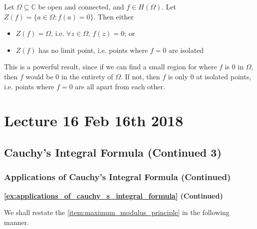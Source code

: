 \documentclass[11pt, oneside]{book}
\begin{document}
\begin{lemma}\label{lemma:principle_of_analytic_continuation}
	Let $\Omega \subseteq \mathbb{C}$ be open and connected, and $f \in H(\Omega)$. Let $Z(f) = \{a \in \Omega : f(a) = 0 \}$. Then either
	\begin{itemize}
		\item $Z(f) = \Omega$, i.e. $\forall z \in \Omega, \, f(z) = 0$; or
		\item $Z(f)$ has no limit point, i.e. points where $f = 0$ are isolated
	\end{itemize}
\end{lemma}

This is a powerful result, since if we can find a small region for where $f$ is $0$ in $\Omega$, then $f$ would be $0$ in the entirety of $\Omega$. If not, then $f$ is only $0$ at isolated points, i.e. points where $f = 0$ are all apart from each other.




\chapter{Lecture 16 Feb 16th 2018}
	\label{chapter:lecture_16_feb_16th_2018}

\section{Cauchy's Integral Formula (Continued 3)} %
\label{sec:cauchy_s_integral_formula_continued_3}

\subsection{Applications of Cauchy's Integral Formula (Continued)} %
\label{sub:applications_of_cauchy_s_integral_formula_continued}

\textbf{\cref{ex:applications_of_cauchy_s_integral_formula} (Continued)}

We shall restate the \cref{item:maximum_modulus_principle} in the following manner.
\end{document}
